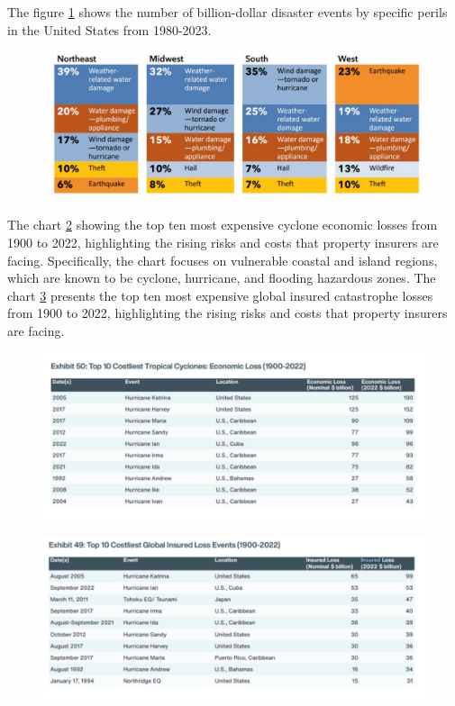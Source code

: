 \documentclass[12pt]{article}
\begin{document}
The figure \ref{fig:regional_disasters} shows the number of billion-dollar disaster events by specific perils in the United States 
from 1980-2023. 

\begin{figure}[ht]
    \centering
    \includegraphics[width=0.8\linewidth]{NAIC Property Threat by Regions.pdf}
    \label{fig:regional_disasters}
    \cite{naic}
\end{figure}

The chart \ref{fig:10economic_loss} showing the top ten most expensive cyclone economic losses from 1900 to 2022, highlighting 
the rising risks and costs that property insurers are facing. Specifically, the chart focuses on vulnerable coastal and island regions,
which are known to be cyclone, hurricane, and flooding hazardous zones. The chart \ref{fig:10global_loss} presents the top ten most expensive global insured catastrophe losses from 1900 to 2022, highlighting 
the rising risks and costs that property insurers are facing. 

\begin{figure}[ht]
    \centering
    \includegraphics[width=0.8\linewidth]{AON Top 10 Cyclones Economic Loss.pdf}
    \label{fig:10economic_loss}
    \cite{aon}
\end{figure}

\begin{figure}[ht]
    \centering
    \includegraphics[width=0.8\linewidth]{AON Top 10 Global Insured Loss Events.pdf}
    \label{fig:10global_loss}
    \cite{aon}
\end{figure}
\end{document}
